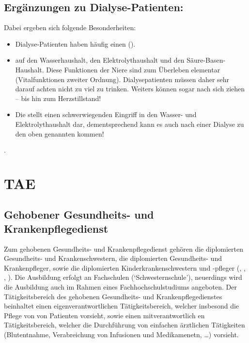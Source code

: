 \documentclass[
ngerman,
paper=a4,
asymmetric,
fontsize=10pt,
draft=false,
numbers=noenddot,
bibtotocnumbered,
footnotes=multiple,
]{scrreprt}
\newcommand{\jNEU}{\vspace{6pt}\noindent{\color{green}\sffamily\textbf{ADDED}\hrulefill\newline}}
\newcommand{\jNEUende}{\newline{\color{green}\rule{\linewidth}{3pt}\newline}}
\begin{document}
\subsection{Ergänzungen zu Dialyse-Patienten:}

\jNeu
Dabei ergeben sich folgende
Besonderheiten: 

\begin{itemize}
  \item Dialyse-Patienten haben häufig einen
   ().
  \item {}
  auf den Wasserhaushalt, den Elektrolythaushalt und den
  Säure-Basen-Haushalt. Diese Funktionen der Niere sind zum
  Überleben elementar (Vitalfunktionen zweiter Ordnung).
  Dialysepatienten müssen daher sehr darauf achten nicht zu
  viel zu trinken. Weiters können 
  sogar  nach sich ziehen --
  bis hin zum Herzstillstand!
  \item Die  stellt einen schwerwiegenden
  Eingriff in den Wasser- und Elektrolythaushalt dar, dementsprechend
  kann es auch nach einer Dialyse zu den oben genannten
   kommen!
\end{itemize}


.
\jNEUende

\section{TAE}
\subsection{Gehobener Gesundheits- und Krankenpflegedienst}
\jNEU
Zum gehobenen Gesundheits- und Krankenpflegedienst gehören
die diplomierten Gesundheits- und Krankenschwestern, die
diplomierten Gesundheits- und Krankenpfleger, sowie die
diplomierten Kinderkrankenschwestern und -pfleger (,
, , ). Die Ausbildung erfolgt
an Fachschulen (\enquote*{Schwesternschule}), neuerdings
wird die Ausbildung auch im Rahmen eines Fachhochschulstudiums angeboten. 
Der Tätigkeitsbereich des gehobenen Gesundheits- und
Krankenpflegedienstes beinhaltet einen
eigenverantwortlichen 
Tätigkeitsbereich, welcher insbesond die Pflege von
von Patienten vorsieht, sowie einen mitverantwortlich en
Tätigkeitsbereich, welcher die Durchführung von einfachen
ärztlichen Tätigkeiten (Blutentnahme, Verabreichung von
Infusionen und Medikamenetn, \ldots) vorsieht.
\jNEUende
\end{document}
